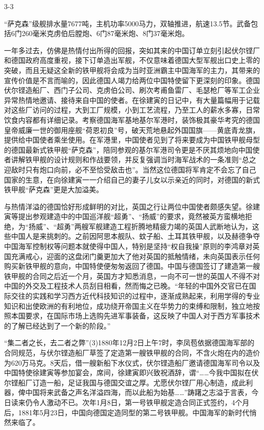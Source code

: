 \documentclass[12pt,UTF8]{ctexbook}
\begin{document}
3-3

“萨克森”级舰排水量7677吨，主机功率5000马力，双轴推进，航速13.5节。武备包括6门260毫米克虏伯后膛炮、6门87毫米炮、8门37毫米炮。

一年多过去，仿佛是热情付出所得的回报，突如其来的中国订单立刻引起伏尔铿厂和德国政府高度重视，接下订单造出军舰，不仅意味着德国大型军舰出口史上零的突破，而且无疑这全新的铁甲舰将会成为当时亚洲霸主中国海军的主力，其带来的宣传价值是不言而喻的，因此德国人竭力给两位中国特使留下更深刻的印象。德国伏尔铿造船厂、西门子公司、克虏伯公司、刷次考甫鱼雷厂、毛瑟枪厂等军工企业异常热情地邀请、接待来自中国的使者。在徐建寅的日记中，有大量篇幅用于记载对这些厂访问的过程，大到工厂规模，小到工艺流程，乃至工人的薪水多寡，日常饮食内容都有详细记录。考察德国海军基地基尔军港时，装饰极其豪华考究的德国皇帝威廉一世的御用座舰“荷恩初良”号，破天荒地悬起外国国旗——黄底青龙旗，提供给中国使者乘坐使用。在军港里，中国使者见到了将来要成为中国铁甲舰母型的德国最新式铁甲舰“萨克森”，陪同参观的基尔军港司令更是不厌其烦地向中国使者讲解铁甲舰的设计规则和作战要领，并反复强调当时海军战术的一条准则“总之迎敌时只有炮口向前，必不至恰受敌击也”。当然这位德国将军肯定不会忘了自己国家的生意，在向徐建寅一一介绍自己的妻子儿女以示亲近的同时，对德国的新式铁甲舰“萨克森”更是大加溢美。

与热情洋溢的德国恰好形成鲜明的对比，英国之行让两位中国使者颇感失望。徐建寅等提出参观建造中的中国巡洋舰“超勇”、“扬威”的要求，竟然被英方蛮横地拒绝，为“扬威”、“超勇”两艘军舰建造工程折腾地精疲力竭的英国人武断地认为，这些中国人是来挑刺的。之前因阿思本舰队、蚊子船、土耳其铁甲舰，以及赫德争夺中国海军控制权等问题本就使得中国人，特别是坚持“权自我操”原则的李鸿章对英国充满戒心，迎面的这盘闭门羹更加大了他对英国的抵触情绪，未向英国表示任何购买新铁甲舰的意向，中国特使便匆匆返回了德国。中国与德国签订了建造第一艘铁甲舰的合同之后近一个月，英国方才知悉消息，一向不可一世的英国人不得不对中国的外交及工程技术人员刮目相看，然而悔之已晚。“年轻的中国外交官已在国际交往的实践和学习西方近代科技知识的过程中，逐渐成熟起来，利用学得的专业知识和出使欧洲的有利地位，成功绕开帝国主义在华势力的束缚和限制，独立地按照本国要求，在国际市场上选购先进军事装备，这反映了中国人对于西方军事技术的了解已经达到了一个新的阶段。”

“集二者之长，去二者之弊”(3)1880年12月2日上午7时，李凤苞依据德国海军部的合同规范，与伏尔铿造船厂草签了定造第一艘铁甲舰的合同，不含火炮在内的造价为620万马克。8天后，借一艘新船下水仪式，伏尔铿造船厂邀请德国海军司令以及中国特使徐建寅等参加宴会，席间，徐建寅即兴致祝酒辞，谓“……今我中国拟在伏尔铿船厂订造一船，足证我国与德国交谊之厚。尤愿伏尔铿厂用心制造，成此利器，俾中国将来武备之声名洋溢四海，而以此船为始基……”踌躇之志溢于言表，今日读来仍令人激动不已。次年1月8日，第一号铁甲舰定造合同正式签约，4个月后，1881年5月23日，中国向德国定造同型的第二号铁甲舰。中国海军的新时代悄然来临了。
\end{document}
